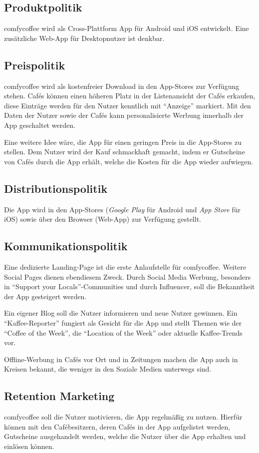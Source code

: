 \subsection{Produktpolitik}
comfycoffee wird als Cross-Plattform App für Android und iOS entwickelt. Eine zusätzliche Web-App für Desktopnutzer ist denkbar.

\subsection{Preispolitik}
comfycoffee wird als kostenfreier Download in den App-Stores zur Verfügung stehen. Cafés können einen höheren Platz in der Listenansicht der Cafés erkaufen, diese Einträge werden für den Nutzer kenntlich mit ``Anzeige'' markiert. Mit den Daten der Nutzer sowie der Cafés kann personalisierte Werbung innerhalb der App geschaltet werden.

Eine weitere Idee wäre, die App für einen geringen Preis in die App-Stores zu stellen. Dem Nutzer wird der Kauf schmackhaft gemacht, indem er Gutscheine von Cafés durch die App erhält, welche die Kosten für die App wieder aufwiegen.

\subsection{Distributionspolitik}
Die App wird in den App-Stores (\emph{Google Play} für Android und \emph{App Store} für iOS) sowie über den Browser (Web-App) zur Verfügung gestellt.

\subsection{Kommunikationspolitik}
Eine dedizierte Landing-Page ist die erste Anlaufstelle für comfycoffee. Weitere Social Pages dienen ebendiesem Zweck. Durch Social Media Werbung, besonders in ``Support your Locals''-Communities und durch Influencer, soll die Bekanntheit der App gesteigert werden.

Ein eigener Blog soll die Nutzer informieren und neue Nutzer gewinnen. Ein ``Kaffee-Reporter'' fungiert als Gesicht für die App und stellt Themen wie der ``Coffee of the Week'', die ``Location of the Week'' oder aktuelle Kaffee-Trends vor.

Offline-Werbung in Cafés vor Ort und in Zeitungen machen die App auch in Kreisen bekannt, die weniger in den Soziale Medien unterwegs sind.

\subsection{Retention Marketing}
comfycoffee soll die Nutzer motivieren, die App regelmäßig zu nutzen. Hierfür können mit den Cafébesitzern, deren Cafés in der App aufgelistet werden, Gutscheine ausgehandelt werden, welche die Nutzer über die App erhalten und einlösen können.

